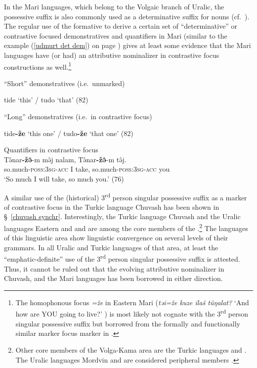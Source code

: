 In the Mari languages, which belong to the Volgaic branch of Uralic, the possessive suffix is also commonly used as a determinative suffix for nouns (cf.~\citealt[75–76]{alhoniemi1993}). The regular use of the formative to derive a certain set of “determinative” or contrastive focused demonstratives and quantifiers in Mari (similar to the  example (\ref{udmurt det dem}) on page \pageref{udmurt det dem}) gives at least some evidence that the Mari languages have (or had) an attributive nominalizer in contrastive focus constructions as well.\footnote{The homophonous focus  \textit{=že} in Eastern Mari (\textit{təi=že kuze ilaš tüŋalat?} ‘And how are YOU going to live?’ \citealt[80]{alhoniemi1993}) is most likely not cognate with the 3\textsuperscript{rd} person singular possessive suffix but borrowed from the formally and functionally similar marker focus marker in .}%
\begin{exe}
\ex {}
\begin{xlist}
\ex \rm{“Short” demonstratives (i.e.~unmarked)} 
\begin{xlist}
\ex tide \rm{‘this’ /} tudo \rm{‘that’ (82)}
\end{xlist}
\ex \rm{“Long” demonstratives (i.e.~in contrastive focus)}
\begin{xlist}
\ex tide\textbf{-že} \rm{‘this one’ /} tudo\textbf{-že} \rm{‘that one’ (82)}%
\end{xlist}
\ex \rm{Quantifiers in contrastive focus}\\
\gll	Tə̂nar\textbf{-žə̂}-m mə̂j nalam, Tə̂nar\textbf{-žə̂}-m tə̂j.\\
	so.much-\textsc{poss:3sg}-\textsc{acc} I take, so.much-\textsc{poss:3sg}-\textsc{acc} you\\
\glt	‘So much I will take, so much you.’ (76)
\end{xlist}
\end{exe}
A similar use of the (historical) 3\textsuperscript{rd} person singular possessive suffix as a marker of contrastive focus in the Turkic language Chuvash has been shown in \S~\ref{chuvash synchr}. Interestingly, the Turkic language Chuvash and the Uralic languages Eastern and  and  are among the core members of the .\footnote{Other core members of the Volga-Kama  area are the Turkic languages  and . The Uralic languages Mordvin and  are considered peripheral members \citep{helimski2005}.} The languages of this linguistic area show linguistic convergence on several levels of their grammars. In all Uralic and Turkic languages of that area, at least the “emphatic-definite” use of the 3\textsuperscript{rd} person singular possessive suffix is attested. Thus, it cannot be ruled out that the evolving attributive nominalizer in Chuvash,  and the Mari languages has been borrowed in either direction.%

